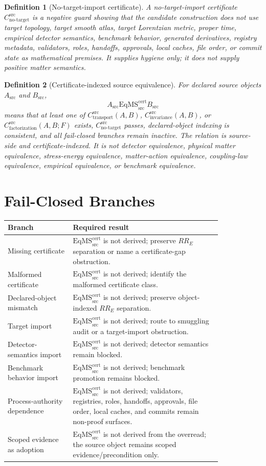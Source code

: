 \documentclass[11pt]{article}
\newcommand{\CTr}{C_{\mathrm{transport}}^{\mathrm{src}}}
\newcommand{\CInv}{C_{\mathrm{invariance}}^{\mathrm{src}}}
\newcommand{\CFact}{C_{\mathrm{factorization}}^{\mathrm{src}}}
\newcommand{\CNTI}{C_{\mathrm{no\text{-}target}}^{\mathrm{src}}}
\newcommand{\EqMS}{\mathrm{EqMS}_{\mathrm{src}}^{\mathrm{cert}}}
\newtheorem{definition}{Definition}
\begin{document}
\begin{definition}[No-target-import certificate]
A no-target-import certificate \(\CNTI\) is a negative guard showing that the
candidate construction does not use target topology, target smooth atlas,
target Lorentzian metric, proper time, empirical detector semantics,
benchmark behavior, generated derivatives, registry metadata, validators,
roles, handoffs, approvals, local caches, file order, or commit state as
mathematical premises. It supplies hygiene only; it does not supply positive
matter semantics.
\end{definition}

\begin{definition}[Certificate-indexed source equivalence]
For declared source objects \(A_{\mathrm{src}}\) and \(B_{\mathrm{src}}\),
\[
  A_{\mathrm{src}} \EqMS B_{\mathrm{src}}
\]
means that at least one of \(\CTr(A,B)\), \(\CInv(A,B)\), or
\(\CFact(A,B;F)\) exists, \(\CNTI\) passes, declared-object indexing is
consistent, and all fail-closed branches remain inactive. The relation is
source-side and certificate-indexed. It is not detector equivalence, physical
matter equivalence, stress-energy equivalence, matter-action equivalence,
coupling-law equivalence, empirical equivalence, or benchmark equivalence.
\end{definition}

\section{Fail-Closed Branches}

\begin{longtable}{p{0.25\linewidth}p{0.58\linewidth}}
\toprule
Branch & Required result \\
\midrule
Missing certificate & \(\EqMS\) is not derived; preserve \(RR_E\) separation
or name a certificate-gap obstruction. \\
Malformed certificate & \(\EqMS\) is not derived; identify the malformed
certificate class. \\
Declared-object mismatch & \(\EqMS\) is not derived; preserve
object-indexed \(RR_E\) separation. \\
Target import & \(\EqMS\) is not derived; route to smuggling audit or a
target-import obstruction. \\
Detector-semantics import & \(\EqMS\) is not derived; detector semantics
remain blocked. \\
Benchmark behavior import & \(\EqMS\) is not derived; benchmark promotion
remains blocked. \\
Process-authority dependence & \(\EqMS\) is not derived; validators,
registries, roles, handoffs, approvals, file order, local caches, and commits
remain non-proof surfaces. \\
Scoped evidence as adoption & \(\EqMS\) is not derived from the overread;
the source object remains scoped evidence/precondition only. \\
\bottomrule
\end{longtable}
\end{document}
